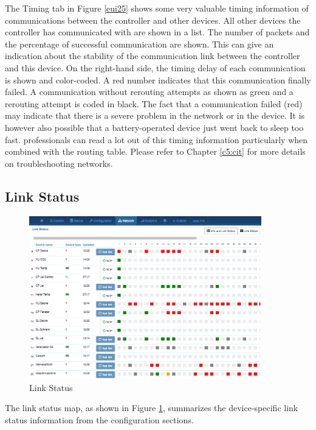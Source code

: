The Timing tab in Figure \ref{eui25} shows some very valuable timing information of 
communications between the controller and other devices. All other devices the controller 
has communicated with are shown in a list. The number of packets and the percentage of 
successful communication are shown. This can give an indication about the stability of 
the communication link between the controller and this device. On the right-hand side, 
the timing delay of each communication is shown and color-coded. A red number indicates 
that this communication finally failed. A communication without rerouting attempts as 
shown as green and a rerouting attempt is coded in black. The fact that a communication 
failed (red) may indicate that there is a severe problem in the network or in the device. 
It is however also possible that a battery-operated device just went back to sleep too fast. 
\zwave professionals can read a lot out of this timing information particularly when combined 
with the routing table. Please refer to Chapter \ref{c5:cit} for more details on 
troubleshooting \zwave networks.


\subsection{Link Status}


\begin{figure}
\begin{center}
\includegraphics[width=0.9\textwidth]{pngs/cap7/eui26.png}
\caption{Link Status}
\label{eui26}
\end{center}
\end{figure}

The link status map, as shown in Figure \ref{eui26}, summarizes the device-specific link 
status information from the configuration sections.

